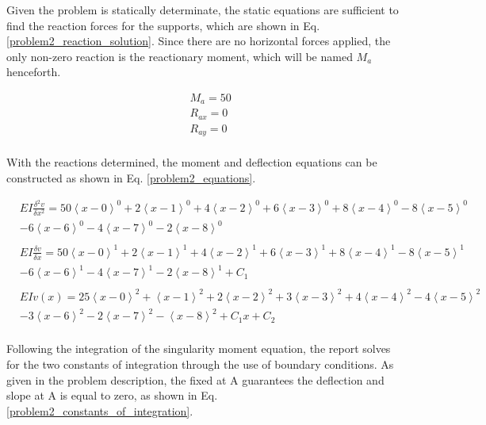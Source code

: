 \documentclass[a4paper]{article}
\begin{document}
Given the problem is statically determinate, the static equations are sufficient to find the reaction forces for the supports, which are shown in Eq. \ref{problem2_reaction_solution}. Since there are no horizontal forces applied, the only non-zero reaction is the reactionary moment, which will be named $M_a$ henceforth.

\begin{equation}
\begin{split}
	& M_a = 50 \\
	& R_{ax} = 0 \\
	& R_{ay} = 0 \\
\end{split}
\label{problem2_reaction_solution}
\end{equation}

With the reactions determined, the moment and deflection equations can be constructed as shown in Eq. \ref{problem2_equations}.

\begin{equation}
    \begin{split}
& EI \frac{\delta^2 v}{\delta x^2} = 50\left<x-0\right>^0 + 2\left<x-1\right>^0 + 4\left<x-2\right>^0 + 6\left<x-3\right>^0 + 8\left<x-4\right>^0   -  8\left<x-5\right>^0 \\
& - 6\left<x-6\right>^0 -  4\left<x-7\right>^0 - 2\left<x-8\right>^0 \\
& \\
& EI \frac{\delta v}{\delta x} = 50\left<x-0\right>^1 + 2\left<x-1\right>^1 + 4\left<x-2\right>^1 +  6\left<x-3\right>^1 + 8\left<x-4\right>^1   -  8\left<x-5\right>^1 \\
& - 6\left<x-6\right>^1 -  4\left<x-7\right>^1 - 2\left<x-8\right>^1 + C_1 \\
& \\
& EI v(x) = 25\left<x-0\right>^2 + \left<x-1\right>^2 + 2\left<x-2\right>^2 +  3\left<x-3\right>^2 + 4\left<x-4\right>^2   -  4\left<x-5\right>^2 \\
& - 3\left<x-6\right>^2  -  2\left<x-7\right>^2 - \left<x-8\right>^2 + C_1 x + C_2 \\
    \end{split}
\label{problem2_equations}
\end{equation}

Following the integration of the singularity moment equation, the report solves for the two constants of integration through the use of boundary conditions. As given in the problem description, the fixed at A guarantees the deflection and slope at A is equal to zero, as shown in Eq. \ref{problem2_constants_of_integration}.
\end{document}
